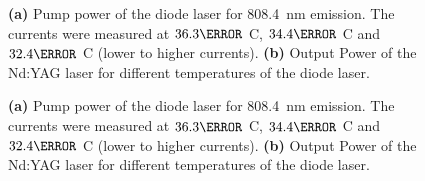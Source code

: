 \documentclass[a4paper]{scrartcl}
\numberwithin{equation}{section}
\numberwithin{figure}{section}
\numberwithin{table}{section}
\begin{document}
\begin{figure}
\centering
{}
\hfill
{}
\caption{\small \textbf{(a)} Pump power of the diode laser for \SI{808.4}{nm} emission. The currents were measured at $36.3 \degree$ C, $34.4 \degree$ C and $32.4 \degree$ C (lower to higher currents). \textbf{(b)} Output Power of the Nd:YAG laser for different temperatures of the diode laser.}
\label{fig:nonlinearofoptics}
\end{figure}

\begin{figure}
\centering
{}
\hfill
{}
\caption{\small \textbf{(a)} Pump power of the diode laser for \SI{808.4}{nm} emission. The currents were measured at $36.3 \degree$ C, $34.4 \degree$ C and $32.4 \degree$ C (lower to higher currents). \textbf{(b)} Output Power of the Nd:YAG laser for different temperatures of the diode laser.}
\label{fig:nonlinearofoptics}
\end{figure}








\clearpage
 

\end{document}
